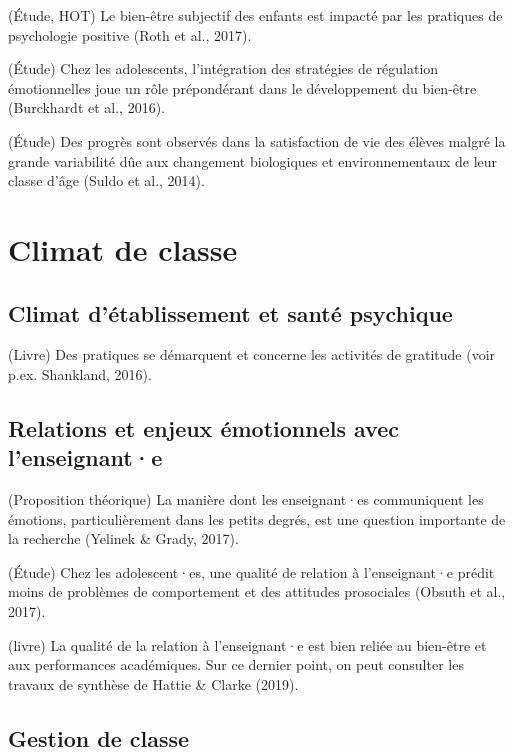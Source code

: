 \documentclass[
  french,
]{article}
\begin{document}
(Étude, HOT) Le bien-être subjectif des enfants est impacté par les pratiques de psychologie positive (Roth et al., 2017).

(Étude) Chez les adolescents, l'intégration des stratégies de régulation émotionnelles joue un rôle prépondérant dans le développement du bien-être (Burckhardt et al., 2016).

(Étude) Des progrès sont observés dans la satisfaction de vie des élèves malgré la grande variabilité dûe aux changement biologiques et environnementaux de leur classe d'âge (Suldo et al., 2014).

\hypertarget{climat-de-classe}{%
\section{Climat de classe}\label{climat-de-classe}}

\hypertarget{climat-duxe9tablissement-et-santuxe9-psychique}{%
\subsection{Climat d'établissement et santé psychique}\label{climat-duxe9tablissement-et-santuxe9-psychique}}

(Livre) Des pratiques se démarquent et concerne les activités de gratitude (voir p.ex. Shankland, 2016).

\hypertarget{relations-et-enjeux-uxe9motionnels-avec-lenseignante}{%
\subsection{Relations et enjeux émotionnels avec l'enseignant·e}\label{relations-et-enjeux-uxe9motionnels-avec-lenseignante}}

(Proposition théorique) La manière dont les enseignant·es communiquent les émotions, particulièrement dans les petits degrés, est une question importante de la recherche (Yelinek \& Grady, 2017).

(Étude) Chez les adolescent·es, une qualité de relation à l'enseignant·e prédit moins de problèmes de comportement et des attitudes prosociales (Obsuth et al., 2017).

(livre) La qualité de la relation à l'enseignant·e est bien reliée au bien-être et aux performances académiques. Sur ce dernier point, on peut consulter les travaux de synthèse de Hattie \& Clarke (2019).

\hypertarget{gestion-de-classe}{%
\subsection{Gestion de classe}\label{gestion-de-classe}}
\end{document}
